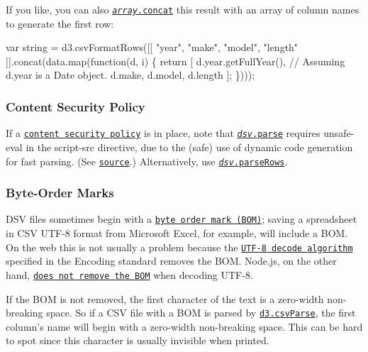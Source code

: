 If you like, you can also \href{https://developer.mozilla.org/en-US/docs/Web/JavaScript/Reference/Global_Objects/Array/concat}{\tt {\itshape array}.concat} this result with an array of column names to generate the first row\+:


\begin{DoxyCode}
var string = d3.csvFormatRows([[
    "year",
    "make",
    "model",
    "length"
  ]].concat(data.map(function(d, i) \{
  return [
    d.year.getFullYear(), // Assuming d.year is a Date object.
    d.make,
    d.model,
    d.length
  ];
\})));
\end{DoxyCode}


\subsubsection*{Content Security Policy}

If a \href{http://www.w3.org/TR/CSP/}{\tt content security policy} is in place, note that \href{#dsv_parse}{\tt {\itshape dsv}.parse} requires {\ttfamily unsafe-\/eval} in the {\ttfamily script-\/src} directive, due to the (safe) use of dynamic code generation for fast parsing. (See \href{https://github.com/d3/d3-dsv/blob/master/src/dsv.js}{\tt source}.) Alternatively, use \href{#dsv_parseRows}{\tt {\itshape dsv}.parse\+Rows}.

\subsubsection*{Byte-\/\+Order Marks}

D\+SV files sometimes begin with a \href{https://en.wikipedia.org/wiki/Byte_order_mark}{\tt byte order mark (B\+OM)}; saving a spreadsheet in C\+SV U\+T\+F-\/8 format from Microsoft Excel, for example, will include a B\+OM. On the web this is not usually a problem because the \href{https://encoding.spec.whatwg.org/#utf-8-decode}{\tt U\+T\+F-\/8 decode algorithm} specified in the Encoding standard removes the B\+OM. Node.\+js, on the other hand, \href{https://github.com/nodejs/node-v0.x-archive/issues/1918}{\tt does not remove the B\+OM} when decoding U\+T\+F-\/8.

If the B\+OM is not removed, the first character of the text is a zero-\/width non-\/breaking space. So if a C\+SV file with a B\+OM is parsed by \href{#csvParse}{\tt d3.\+csv\+Parse}, the first column’s name will begin with a zero-\/width non-\/breaking space. This can be hard to spot since this character is usually invisible when printed.

